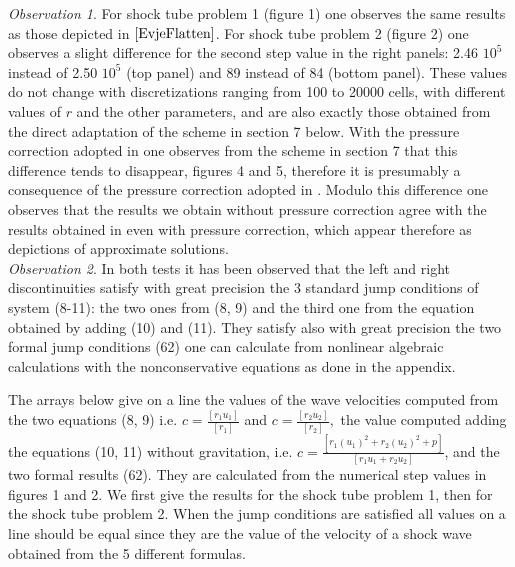 \documentclass[a4paper,12pt]{article}
\begin{document}
\textit{Observation 1}. For shock tube problem 1 (figure 1) one observes  the same results as those depicted in $\cite{EvjeFlatten}$. For shock tube problem 2 (figure 2) one observes a slight difference for the second step  value in the right panels: 2.46 $10^5$ instead of 2.50 $10^5$ (top panel) and 89 instead of 84 (bottom panel). These values do not change with discretizations ranging from 100 to 20000 cells, with different values of $r$ and the other parameters, and are also  exactly those obtained from the direct adaptation of the scheme in  section 7 below. With the pressure correction adopted in \cite{EvjeFlatten} one observes from the scheme in section 7 that this difference tends to disappear, figures 4 and 5, therefore it is presumably a consequence of  the pressure correction adopted in \cite{EvjeFlatten}. Modulo this difference one observes  that the results we obtain without pressure correction agree with the results obtained in \cite{EvjeFlatten} even with pressure correction, which appear therefore as depictions of approximate solutions. \\

\textit{Observation 2}. In both tests it has been observed that the left and right discontinuities satisfy with great precision the 3 standard jump conditions of system (8-11): the two ones from (8, 9) and the third one from the equation obtained by adding (10) and (11). They satisfy also with great precision the two formal jump conditions (62) one can calculate from nonlinear algebraic calculations with the nonconservative equations as done in the appendix.  

The arrays below give on a line the values of the wave velocities computed from the two equations (8, 9) i.e. $c=\frac{[r_1u_1]}{[r_1]}$ and  $c=\frac{[r_2u_2]}{[r_2]},$  the value computed  adding the equations (10, 11) without gravitation, i.e. $c=\frac{[r_1(u_1)^2+r_2(u_2)^2+p]}{[r_1u_1+r_2u_2]}$, and the two formal results (62). They are calculated from the numerical step values in figures 1 and 2. We first give the results for the shock tube problem 1, then for the shock tube problem 2. When the jump conditions are satisfied all values on a line should be equal since they are the value of the velocity of a shock wave obtained from the 5 different formulas.

\vskip13cm


 \begin{figure}[h]
\centering

\end{figure}
\end{document}
